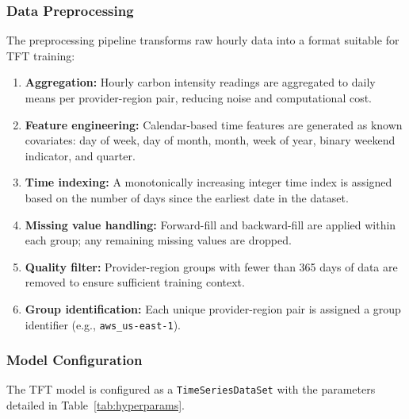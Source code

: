 \documentclass[conference]{IEEEtran}
\begin{document}
\subsubsection{Data Preprocessing}

The preprocessing pipeline transforms raw hourly data into a format suitable for TFT training:

\begin{enumerate}
    \item \textbf{Aggregation:} Hourly carbon intensity readings are aggregated to daily means per provider-region pair, reducing noise and computational cost.
    \item \textbf{Feature engineering:} Calendar-based time features are generated as known covariates: day of week, day of month, month, week of year, binary weekend indicator, and quarter.
    \item \textbf{Time indexing:} A monotonically increasing integer time index is assigned based on the number of days since the earliest date in the dataset.
    \item \textbf{Missing value handling:} Forward-fill and backward-fill are applied within each group; any remaining missing values are dropped.
    \item \textbf{Quality filter:} Provider-region groups with fewer than 365 days of data are removed to ensure sufficient training context.
    \item \textbf{Group identification:} Each unique provider-region pair is assigned a group identifier (e.g., \texttt{aws\_us-east-1}).
\end{enumerate}

\subsubsection{Model Configuration}

The TFT model is configured as a \texttt{TimeSeriesDataSet} with the parameters detailed in Table~\ref{tab:hyperparams}.
\end{document}
